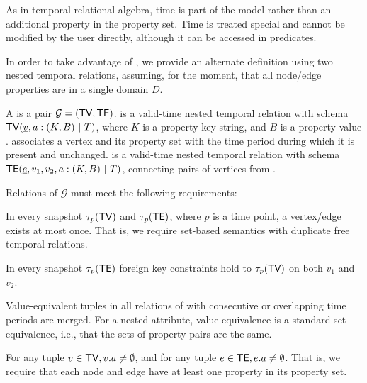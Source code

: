 As in temporal relational algebra, time is part of the model rather
than an additional property in the property set.  Time is treated
special and cannot be modified by the user directly, although it can
be accessed in predicates.  

In order to take advantage of \tra, we provide an alternate definition
using two nested temporal relations, assuming, for the
  moment, that all node/edge properties are in a single domain $D$.

\begin{definition}
\label{def:tg2}
A \tg is a pair $\mathcal{G}=(\textsf{TV}, \textsf{TE})$. \tv is a valid-time nested
temporal relation with schema $\textsf{TV}(\underline{v}, a: (K,B) ~|~T)$,
where $K$ is a property key string, and $B$ is a property value
.  \tv
associates a vertex and its property set with the time period during
which it is present and unchanged. \te is a valid-time nested temporal
relation with schema $\textsf{TE}(\underline{e}, v_1, v_2, a:
(K,B) ~|~T)$, connecting pairs of vertices from \tv.

Relations of $\mathcal{G}$ must meet the following requirements:

\begin{description}[noitemsep,itemindent=\dimexpr\labelwidth+\labelsep\relax,leftmargin=0pt]
\item [R1: Unique vertices/ edges] In every snapshot $\tau_p (\textsf{TV})$
  and $\tau_p (\textsf{TE})$, where $p$ is a time point, a vertex/edge
  exists at most once.  That is, we require set-based semantics with
  duplicate free temporal relations.
\item [R2: Referential integrity] In every snapshot $\tau_p(\textsf{TE})$
  foreign key constraints hold to $\tau_p (\textsf{TV})$ on both $v_1$ and
  $v_2$.
\item [R3: Coalesced] Value-equivalent tuples in all relations of \tve
  with consecutive or overlapping time periods are merged.  For a
  nested attribute, value equivalence is a standard set equivalence,
  i.e., that the sets of property pairs are the same.
\item [R4: Required property] For any tuple $v \in \textsf{TV}, v.a \neq
  \emptyset$, and for any tuple $e \in \textsf{TE}, e.a \neq \emptyset$.  That
  is, we require that each node and edge have at least one property in
  its property set.
\end{description}
\end{definition}

